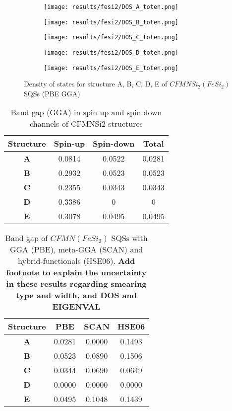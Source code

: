 \begin{figure}
\begin{subfigure}{0.5\textwidth}
\texttt{[image: results/fesi2/DOS\_A\_toten.png]}
\end{subfigure}
\begin{subfigure}{0.5\textwidth}
\texttt{[image: results/fesi2/DOS\_B\_toten.png]}
\end{subfigure}
\begin{subfigure}{0.5\textwidth}
\texttt{[image: results/fesi2/DOS\_C\_toten.png]}
\end{subfigure}
\begin{subfigure}{0.5\textwidth}
\texttt{[image: results/fesi2/DOS\_D\_toten.png]}
\end{subfigure}
\begin{subfigure}{0.5\textwidth}
\texttt{[image: results/fesi2/DOS\_E\_toten.png]}
\end{subfigure}
\caption{Density of states for structure A, B, C, D, E of $CFMNSi_2 (FeSi_2)$ SQSs (PBE GGA)}
\label{dos_fesi2_gga}
\end{figure}

\begin{table}[]
\centering
\begin{tabular}{@{}cccc@{}}
\toprule
Structure  & Spin-up & Spin-down & Total  \\ \midrule
\textbf{A} & 0.0814  & 0.0522    & 0.0281 \\
\textbf{B} & 0.2932  & 0.0523    & 0.0523 \\
\textbf{C} & 0.2355  & 0.0343    & 0.0343 \\
\textbf{D} & 0.3386  & 0         & 0      \\
\textbf{E} & 0.3078  & 0.0495    & 0.0495 \\ \bottomrule
\end{tabular}
\caption{Band gap (GGA) in spin up and spin down channels of CFMNSi2 structures}
\end{table}

\begin{table}[]
\centering
\begin{tabular}{@{}cccc@{}}
\toprule
Structure  & PBE    & SCAN   & HSE06  \\ \midrule
\textbf{A} & 0.0281 & 0.0000 & 0.1493 \\
\textbf{B} & 0.0523 & 0.0890 & 0.1506 \\
\textbf{C} & 0.0344 & 0.0690 & 0.0649 \\
\textbf{D} & 0.0000 & 0.0000 & 0.0000 \\
\textbf{E} & 0.0495 & 0.1048 & 0.1439 \\ \bottomrule
\end{tabular}
\caption{Band gap of $CFMN (FeSi_2)$ SQSs with GGA (PBE), meta-GGA (SCAN) and hybrid-functionals (HSE06). \textbf{Add footnote to explain the uncertainty in these results regarding smearing type and width, and DOS and EIGENVAL}}
\end{table}
